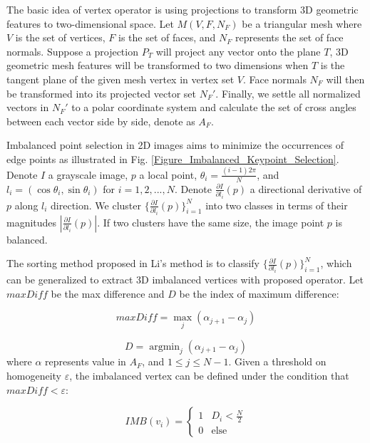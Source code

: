 \documentclass[10pt, conference, compsocconf]{IEEEtran}
\begin{document}
The basic idea of vertex operator is using projections to transform 3D geometric features to two-dimensional space. Let $M(V,F,N_F)$ be a triangular mesh where $V$ is the set of vertices, $F$ is the set of faces, and $N_F$ represents the set of face normals. Suppose a projection $P_T$ will project any vector onto the plane $T$, 3D geometric mesh features will be transformed to two dimensions when $T$ is the tangent plane of the given mesh vertex in vertex set $V$. Face normals $N_F$ will then be transformed into its projected vector set $N_F\prime$. Finally, we settle all normalized vectors in $N_F\prime$ to a polar coordinate system and calculate the set of cross angles between each vector side by side, denote as $A_F$.

Imbalanced point selection in 2D images aims to minimize the occurrences of edge points\cite{Li2008Interest} as illustrated in Fig. \ref{Figure_Imbalanced_Keypoint_Selection}. Denote $I$ a grayscale image, $p$ a local point, $\theta_i=\frac{(i-1)2\pi}{N}$, and $l_i=(\cos\theta_i ,\sin\theta_i)$ for $i=1,2,...,N$. Denote $\frac{\partial{I}}{\partial{l_i}}(p)$ a directional derivative of $p$ along $l_i$ direction. We cluster $\{\frac{\partial{I}}{\partial{l_i}}(p)\}^{N}_{i=1}$ into two classes in terms of their magnitudes $|\frac{\partial{I}}{\partial{l_i}}(p)|$. If two clusters have the same size, the image point $p$ is balanced.

The sorting method proposed in Li's method is to classify $\{\frac{\partial{I}}{\partial{l_i}}(p)\}^{N}_{i=1}$, which can be generalized to extract 3D imbalanced vertices with proposed operator. Let $maxDiff$ be the max difference and $D$ be the index of maximum difference:

\begin{equation}\label{Equation_MaxDiff}
  maxDiff=\max_j(\alpha_{j+1}-\alpha_j)
\end{equation}

\begin{equation}\label{Equation_D}
  D=\mathop{\arg\min}_{j}(\alpha_{j+1}-\alpha_j)
\end{equation}
where $\alpha$ represents value in $A_F$, and $1\leq{j}\leq{N-1}$. Given a threshold on homogeneity $\varepsilon$, the imbalanced vertex can be defined under the condition that $maxDiff<\varepsilon$:

\begin{equation}\label{Equation_IMB}
  IMB(v_i)=
    \begin{cases}
    1& \text{$D_i<\frac{N}{2}$} \\
    0& \text{else}
    \end{cases}
\end{equation}
\end{document}
